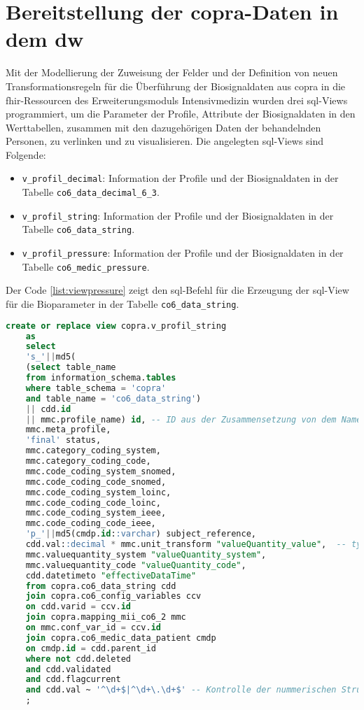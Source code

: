 \section{Bereitstellung der \acs{copra}-Daten in dem \acs{dw}} \label{sec:prepdwtofhir}

Mit der Modellierung der Zuweisung der Felder und der Definition von neuen Transformationsregeln für die Überführung der Biosignaldaten aus \ac{copra} in die \ac{fhir}-Ressourcen des Erweiterungsmoduls \glqq Intensivmedizin\grqq{} wurden drei \ac{sql}-Views programmiert, um die Parameter der Profile, Attribute der Biosignaldaten in den Werttabellen, zusammen mit den dazugehörigen Daten der behandelnden Personen, zu verlinken und zu visualisieren. Die angelegten \ac{sql}-Views sind Folgende:

\begin{itemize}
	\item \texttt{v\_profil\_decimal}: Information der Profile und der Biosignaldaten in der Tabelle \texttt{co6\_data\_decimal\_6\_3}.
	\item \texttt{v\_profil\_string}: Information der Profile und der Biosignaldaten in der Tabelle \texttt{co6\_data\_string}.
    \item \texttt{v\_profil\_pressure}: Information der Profile und der Biosignaldaten in der Tabelle \texttt{co6\_medic\_pressure}.
\end{itemize}

Der Code \ref{list:viewpressure} zeigt den \ac{sql}-Befehl für die Erzeugung der \ac{sql}-View für die Bioparameter in der Tabelle \texttt{co6\_data\_string}. 

\begin{lstlisting}[language=SQL, caption={[SQL-View für Werte in co6\_data\_string] SQL-View für Werte in co6\_data\_string.}, captionpos=b, label=list:viewsdicimalstring]
	create or replace view copra.v_profil_string 
	as
	select 
	's_'||md5(
	(select table_name 
	from information_schema.tables 
	where table_schema = 'copra'
	and table_name = 'co6_data_string') 
	|| cdd.id 
	|| mmc.profile_name) id, -- ID aus der Zusammensetzung von dem Name der Werttabelle, id des Werts und name des Profils
	mmc.meta_profile,
	'final' status,
	mmc.category_coding_system,
	mmc.category_coding_code,
	mmc.code_coding_system_snomed,
	mmc.code_coding_code_snomed,
	mmc.code_coding_system_loinc,
	mmc.code_coding_code_loinc,
	mmc.code_coding_system_ieee,
	mmc.code_coding_code_ieee,
	'p_'||md5(cmdp.id::varchar) subject_reference,
	cdd.val::decimal * mmc.unit_transform "valueQuantity_value",  -- type casting umd Umrechnung
	mmc.valuequantity_system "valueQuantity_system",
	mmc.valuequantity_code "valueQuantity_code",
	cdd.datetimeto "effectiveDataTime"
	from copra.co6_data_string cdd 
	join copra.co6_config_variables ccv 
	on cdd.varid = ccv.id 
	join copra.mapping_mii_co6_2 mmc 
	on mmc.conf_var_id = ccv.id 
	join copra.co6_medic_data_patient cmdp 
	on cmdp.id = cdd.parent_id 
	where not cdd.deleted
	and cdd.validated 
	and cdd.flagcurrent
	and cdd.val ~ '^\d+$|^\d+\.\d+$' -- Kontrolle der nummerischen Struktur der Werte
	;
\end{lstlisting}



